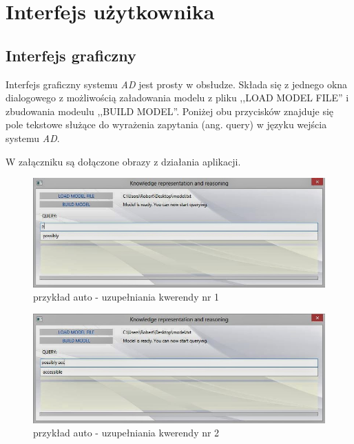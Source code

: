 \documentclass[a4paper]{article}
\begin{document}
\section{Interfejs użytkownika}
    \subsection{Interfejs graficzny}

        Interfejs graficzny systemu \textit{AD} jest prosty w obsłudze.
        Składa się z jednego okna dialogowego z możliwością załadowania
        modelu z pliku ,,LOAD MODEL FILE'' i zbudowania modeulu
        ,,BUILD MODEL''. Poniżej obu przycisków znajduje się pole tekstowe
        służące do wyrażenia zapytania (ang. query) w języku wejścia 
        systemu \textit{AD}.

        W załączniku są dołączone obrazy z działania aplikacji.

        \begin{figure}[p]
            \centering
            \includegraphics[width=\textwidth]{images/acomp_1.jpg}
            \caption{przykład auto - uzupełniania kwerendy nr 1}
            \label{fig:acomp1}
        \end{figure}

        \begin{figure}[p]
            \centering
            \includegraphics[width=\textwidth]{images/acomp_2.jpg}
            \caption{przykład auto - uzupełniania kwerendy nr 2}
            \label{fig:acomp2}
        \end{figure}
\end{document}
